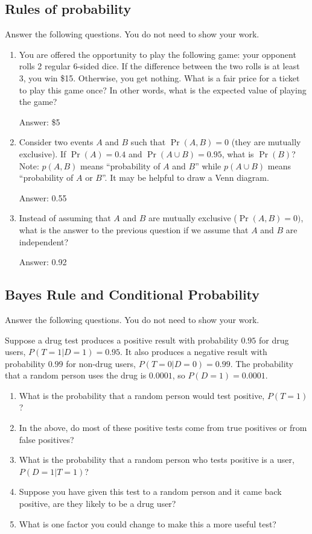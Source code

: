 \documentclass{article}
\def\ans#1{\par\gre{Answer: #1}}
\def\blu#1{{\color{blu}#1}}
\def\gre#1{{\color{gre}#1}}
\begin{document}
\subsection{Rules of probability}

\blu{Answer the following questions.} You do not need to show your work.

\begin{enumerate}
\item You are offered the opportunity to play the following game: your opponent rolls 2 regular 6-sided dice. If the difference between the two rolls is at least 3, you win \$15. Otherwise, you get nothing. What is a fair price for a ticket to play this game once? In other words, what is the expected value of playing the game?
\ans{\$5}
\item Consider two events $A$ and $B$ such that $\Pr(A, B)=0$ (they are mutually exclusive). If $\Pr(A) = 0.4$ and $\Pr(A \cup B) = 0.95$, what is $\Pr(B)$? Note: $p(A, B)$ means
``probability of $A$ and $B$'' while $p(A \cup B)$ means ``probability of $A$ or $B$''. It may be helpful to draw a Venn diagram.
\ans{0.55}
\item Instead of assuming that $A$ and $B$ are mutually exclusive ($\Pr(A,B) = 0)$, what is the answer to the previous question if we assume that $A$ and $B$ are independent?
\ans{0.92}
\end{enumerate}

\subsection{Bayes Rule and Conditional Probability}

\blu{Answer the following questions.} You do not need to show your work.

Suppose a drug test produces a positive result with probability $0.95$ for drug users, $P(T=1|D=1)=0.95$. It also produces a negative result with probability $0.99$ for non-drug users, $P(T=0|D=0)=0.99$. The probability that a random person uses the drug is $0.0001$, so $P(D=1)=0.0001$. 

\begin{enumerate}
\item What is the probability that a random person would test positive, $P(T=1)$?
\item In the above, do most of these positive tests come from true positives or from false positives? 
\item What is the probability that a random person who tests positive is a user, $P(D=1|T=1)$?
\item Suppose you have given this test to a random person and it came back positive, are they likely to be a drug user?
\item What is one factor you could change to make this a more useful test?
\end{enumerate}
\end{document}
